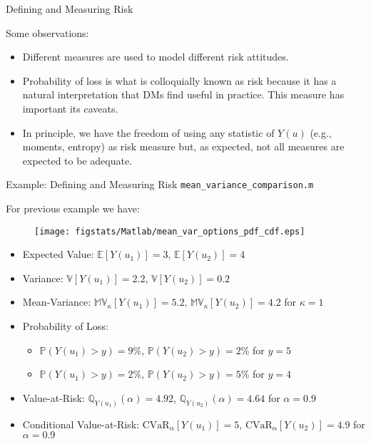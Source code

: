 \documentclass[handout,9pt]{beamer}
\begin{document}
%
\begin{frame}{Defining and Measuring Risk}

Some observations:
\begin{itemize}
   \setlength{\itemsep}{10pt}
\item Different measures are used to model different risk attitudes. 

\item Probability of loss is what is colloquially known as risk because it has a natural interpretation that DMs find useful in practice. This measure has important its caveats. 

\item In principle, we have the freedom of using any statistic of $Y(u)$ (e.g., moments, entropy) as risk measure but, as expected, not all measures are expected to be adequate.   
\end{itemize}

\end{frame}

%
\begin{frame}{Example: Defining and Measuring Risk \footnotesize{\texttt{mean\_variance\_comparison.m}}}

For previous example we have:
\begin{figure}[!htb]
    \centering
	\texttt{[image: figstats/Matlab/mean\_var\_options\_pdf\_cdf.eps]}
\end{figure}
\vspace{-0.1in}
\begin{itemize}
   \setlength{\itemsep}{10pt}
\item Expected Value: $\mathbb{E}[Y(u_1)]=3$, $\mathbb{E}[Y(u_2)]=4$
\item Variance: $\mathbb{V}[Y(u_1)]=2.2$, $\mathbb{V}[Y(u_2)]=0.2$
\item Mean-Variance: $\mathbb{MV}_\kappa[Y(u_1)]=5.2$, $\mathbb{MV}_\kappa[Y(u_2)]=4.2$ for $\kappa=1$
\item Probability of Loss: 
\begin{itemize}
\item $\mathbb{P}(Y(u_1)>y)=9\%$, $\mathbb{P}(Y(u_2)> y)=2\%$  for $y=5$
\item $\mathbb{P}(Y(u_1)>y)=2\%$, $\mathbb{P}(Y(u_2)> y)=5\%$  for $y=4$
\end{itemize}
\item Value-at-Risk: $\mathbb{Q}_{Y(u_1)}(\alpha)=4.92$, $\mathbb{Q}_{Y(u_2)}(\alpha)=4.64$ for $\alpha=0.9$
\item Conditional Value-at-Risk: $\textrm{CVaR}_\alpha[Y(u_1)]=5$, $\textrm{CVaR}_\alpha[Y(u_2)]=4.9$  for $\alpha=0.9$
\end{itemize}

\end{frame}
\end{document}
